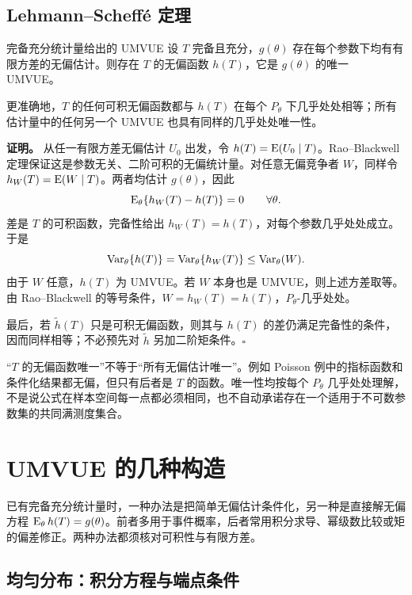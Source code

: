 \subsection{Lehmann--Scheff\'e 定理}

\begin{definitionbox}{完备充分统计量给出的 UMVUE}
设 $T$ 完备且充分，$g(\theta)$ 存在每个参数下均有有限方差的无偏估计。则存在 $T$ 的无偏函数 $h(T)$，它是 $g(\theta)$ 的唯一 UMVUE。

更准确地，$T$ 的任何可积无偏函数都与 $h(T)$ 在每个 $P_\theta$ 下几乎处处相等；所有估计量中的任何另一个 UMVUE 也具有同样的几乎处处唯一性。
\end{definitionbox}

\textbf{证明。} 从任一有限方差无偏估计 $U_0$ 出发，令 $h(T)=\operatorname{E}(U_0\mid T)$。Rao--Blackwell 定理保证这是参数无关、二阶可积的无偏统计量。对任意无偏竞争者 $W$，同样令 $h_W(T)=\operatorname{E}(W\mid T)$。两者均估计 $g(\theta)$，因此
\[
 \operatorname{E}_\theta\{h_W(T)-h(T)\}=0\qquad\forall\theta.
\]
差是 $T$ 的可积函数，完备性给出 $h_W(T)=h(T)$，对每个参数几乎处处成立。于是
\[
 \operatorname{Var}_\theta\{h(T)\}
 =\operatorname{Var}_\theta\{h_W(T)\}
 \leq\operatorname{Var}_\theta(W).
\]
由于 $W$ 任意，$h(T)$ 为 UMVUE。若 $W$ 本身也是 UMVUE，则上述方差取等。由 Rao--Blackwell 的等号条件，$W=h_W(T)=h(T)$，$P_\theta$-几乎处处。

最后，若 $\widetilde h(T)$ 只是可积无偏函数，则其与 $h(T)$ 的差仍满足完备性的条件，因而同样相等；不必预先对 $\widetilde h$ 另加二阶矩条件。\hfill$\square$

\begin{notebox}[唯一性的范围]
“$T$ 的无偏函数唯一”不等于“所有无偏估计唯一”。例如 Poisson 例中的指标函数和条件化结果都无偏，但只有后者是 $T$ 的函数。唯一性均按每个 $P_\theta$ 几乎处处理解，不是说公式在样本空间每一点都必须相同，也不自动承诺存在一个适用于不可数参数集的共同满测度集合。
\end{notebox}

\section{UMVUE 的几种构造}

已有完备充分统计量时，一种办法是把简单无偏估计条件化，另一种是直接解无偏方程 $\operatorname{E}_\theta h(T)=g(\theta)$。前者多用于事件概率，后者常用积分求导、幂级数比较或矩的偏差修正。两种办法都须核对可积性与有限方差。

\subsection{均匀分布：积分方程与端点条件}

